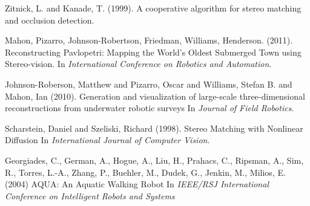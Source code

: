 \documentclass{llncs}
\begin{document}
\begin{thebibliography}{9}
Zitnick, L. and Kanade, T. (1999).
\newblock A cooperative algorithm for stereo matching and occlusion detection.

Mahon, Pizarro, Johnson-Robertson, Friedman, Williams, Henderson. (2011).
\newblock Reconstructing Pavlopetri: Mapping the World's Oldest Submerged Town using Stereo-vision.
\newblock In {\em International Conference on Robotics and Automation}.

Johnson-Roberson, Matthew and Pizarro, Oscar and Williams, Stefan B. and Mahon, Ian (2010).
\newblock Generation and visualization of large-scale three-dimensional reconstructions from underwater robotic surveys
\newblock In {\em Journal of Field Robotics}.

Scharstein, Daniel and Szeliski, Richard (1998).
\newblock Stereo Matching with Nonlinear Diffusion
\newblock In {\em International Journal of Computer Vision}.

Georgiades, C., German, A., Hogue, A., Liu, H., Prahacs, C., Ripsman, A., Sim, R., Torres, L.-A., Zhang, P., Buehler, M., Dudek, G., Jenkin, M., Milios, E. (2004)
\newblock AQUA: An Aquatic Walking Robot 
\newblock In {\em IEEE/RSJ International Conference on Intelligent Robots and Systems}
\end{thebibliography}
\end{document}
